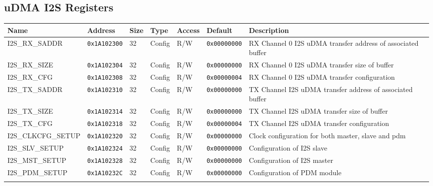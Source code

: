 
\subsection{uDMA I2S Registers}
{\small
\begin{tabularx}{\textwidth}{|l|l|l|l|l|l|X|}
  \hline
  \textbf{Name} & \textbf{Address}  & \textbf{Size} & \textbf{Type} & \textbf{Access} & \textbf{Default} & \textbf{Description} \\
  \hline
  I2S\_RX\_SADDR & \texttt{0x1A102300} & 32 & Config & R/W & \texttt{0x00000000} & RX Channel 0 I2S uDMA transfer address of associated buffer\\
  \hline
  I2S\_RX\_SIZE & \texttt{0x1A102304} & 32 & Config & R/W & \texttt{0x00000000} & RX Channel 0 I2S uDMA transfer size of buffer\\
  \hline
  I2S\_RX\_CFG & \texttt{0x1A102308} & 32 & Config & R/W & \texttt{0x00000004} & RX Channel 0 I2S uDMA transfer configuration\\
  \hline
  I2S\_TX\_SADDR & \texttt{0x1A102310} & 32 & Config & R/W & \texttt{0x00000000} &  TX Channel I2S uDMA transfer address of associated buffer\\
  \hline
  I2S\_TX\_SIZE & \texttt{0x1A102314} & 32 & Config & R/W & \texttt{0x00000000} &  TX Channel I2S uDMA transfer size of buffer\\
  \hline
  I2S\_TX\_CFG & \texttt{0x1A102318} & 32 & Config & R/W & \texttt{0x00000004} &  TX Channel I2S uDMA transfer configuration\\
  \hline
  I2S\_CLKCFG\_SETUP & \texttt{0x1A102320} & 32 & Config & R/W & \texttt{0x00000000} & Clock configuration for both master, slave and pdm\\
  \hline
  I2S\_SLV\_SETUP & \texttt{0x1A102324} & 32 & Config & R/W & \texttt{0x00000000} & Configuration of I2S slave\\
  \hline
  I2S\_MST\_SETUP & \texttt{0x1A102328} & 32 & Config & R/W & \texttt{0x00000000} & Configuration of I2S master\\
  \hline
  I2S\_PDM\_SETUP & \texttt{0x1A10232C} & 32 & Config & R/W & \texttt{0x00000000} & Configuration of PDM module\\
  \hline
  \caption{uDMA I2S}
\end{tabularx}
}





